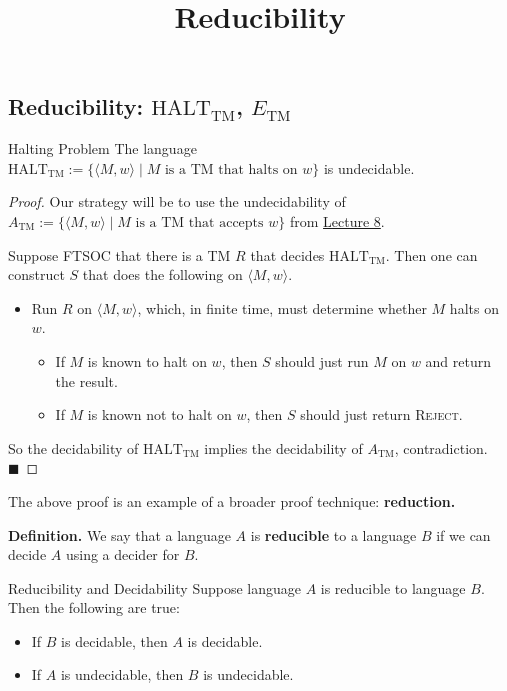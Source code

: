 \title{Reducibility}



\subsection{Reducibility:
$\mathrm{HALT}_{\mathrm{TM}}$, $E_{\mathrm{TM}}$}

\begin{theorem}{Halting Problem}
    The language $\mathrm{HALT}_{\mathrm{TM}} :=
    \{\langle M, w \rangle \mid M \text{ is a TM that halts on } w\}$
    is undecidable.
\end{theorem}

\begin{proof}
    Our strategy will be to use the undecidability of
    $A_{\mathrm{TM}} := \{\langle M, w \rangle \mid
    M \text{ is a TM that accepts } w\}$ from
    \href{/18.404/lectures/8/#a-tm-undecidability}{Lecture 8}.

    Suppose FTSOC that there is a TM $R$
    that decides $\mathrm{HALT}_{\mathrm{TM}}$.
    Then one can construct $S$
    that does the following on $\langle M, w \rangle$.
    \begin{itemize}
        \item Run $R$ on $\langle M, w \rangle$,
        which, in finite time, must determine whether
        $M$ halts on $w$.
        \begin{itemize}
            \item If $M$ is known to halt on $w$, then
            $S$ should just run $M$ on $w$ and return the result.
            \item If $M$ is known not to halt on $w$, then
            $S$ should just return \textsc{Reject}.
        \end{itemize}
    \end{itemize}
    So the decidability of $\mathrm{HALT}_{\mathrm{TM}}$
    implies the decidability of $A_{\mathrm{TM}}$,
    contradiction. ~ $\blacksquare$
\end{proof}

The above proof is an example
of a broader proof technique: \textbf{reduction.}

\textbf{Definition.}
We say that a language $A$ is \textbf{reducible} to a language $B$
if we can decide $A$ using a decider for $B$.

\begin{theorem}{Reducibility and Decidability}
    Suppose language $A$ is reducible to language $B$.
    Then the following are true:
    \begin{itemize}
        \item If $B$ is decidable, then $A$ is decidable.
        \item If $A$ is undecidable, then $B$ is undecidable.
    \end{itemize}
\end{theorem}

